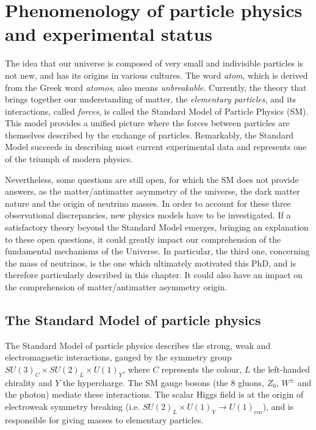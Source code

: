 \chapter{Phenomenology of particle physics and experimental status}
\label{ch:pheno}

The idea that our universe is composed of very small and indivisible particles is not new, and has its origins in various cultures.
The word \emph{atom}, which is derived from the Greek word \emph{atomos}, also means \emph{unbreakable}.
Currently, the theory that brings together our understanding of matter, the \emph{elementary particles}, and its interactions, called \emph{forces}, is called the Standard Model of Particle Physics (SM).
This model provides a unified picture where the forces between particles are themselves described by the exchange of particles.
Remarkably, the Standard Model succeeds in describing most current experimental data and represents one of the triumph of modern physics.

Nevertheless, some questions are still open, for which the SM does not provide answers, as the matter/antimatter asymmetry of the universe, the dark matter nature and the origin of neutrino masses.
In order to account for these three observational discrepancies, new physics models have to be investigated.
If a satisfactory theory beyond the Standard Model emerges, bringing an explanation to these open questions, it could greatly impact our comprehension of the fundamental mechanisms of the Universe.
In particular, the third one, concerning the mass of neutrinos, is the one which ultimately motivated this PhD, and is therefore particularly described in this chapter.
It could also have an impact on the comprehension of matter/antimatter asymmetry origin.

\section{The Standard Model of particle physics}


The Standard Model of particle physics describes the strong, weak and electromagnetic interactions, gauged by the symmetry group $SU(3)_{C}\times SU(2)_{L}\times U(1)_{Y}$, where $C$ represents the colour, $L$ the left-handed chirality and $Y$ the hypercharge.
The SM gauge bosons (the $8$ gluons, $Z_{0}$, $W^{\pm}$ and the photon) mediate these interactions.
The scalar Higgs field is at the origin of electroweak symmetry breaking (i.e. $SU(2)_{L}\times U(1)_{Y} \rightarrow U(1)_{em}$), and is responsible for giving masses to elementary particles.

